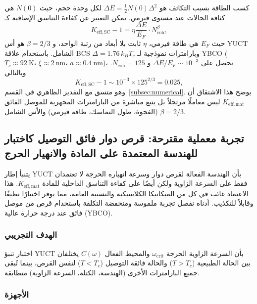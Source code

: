 \documentclass[12pt,a4paper]{article}
\begin{document}
	كسب الطاقة بسبب التكاثف هو \(\Delta E = \frac{1}{2} N(0) \Delta^2\) لكل وحدة حجم، حيث \(N(0)\) هي كثافة الحالات عند مستوى فيرمي. يمكن التعبير عن كفاءة التناسق الإضافية كـ
	\[
	K_{\mathrm{eff,SC}} - 1 = \eta \frac{\Delta E}{E_F} \cdot N_{\text{coh}}^{\beta},
	\]
	حيث \(E_F\) هي طاقة فيرمي، \(\eta\) ثابت بلا أبعاد من رتبة الواحد، و \(\beta = 2/3\) هو أس YUCT الشامل. باستخدام علاقة BCS \(\Delta = 1.76 \, k_B T_c\) وبارامترات نموذجية لـ YBCO (\(T_c \approx 92\ \text{K}\)، \(\xi \approx 2\ \text{nm}\)، \(a \approx 0.4\ \text{nm}\))، نحصل على \(\Delta E/E_F \sim 10^{-3}\) و \(N_{\text{coh}} = 125\). وبالتالي
	\[
	K_{\mathrm{eff,SC}} - 1 \sim 10^{-3} \times 125^{2/3} = 0.025,
	\]
	وهو متسق مع التقدير الظاهري في القسم~\ref{subsec:numerical}. يوضح هذا الاشتقاق أن \(K_{\mathrm{eff,mat}}\) ليس معاملًا مرتجلاً بل يتبع مباشرة من البارامترات المجهرية للموصل الفائق (الفجوة، طول التماسك، طاقة فيرمي) والأس الشامل \(\beta = 2/3\).
	
	\subsection{تجربة معملية مقترحة: قرص دوار فائق التوصيل كاختبار للهندسة المعتمدة على المادة والانهيار الحرج}
	
	يتنبأ إطار YUCT بأن الهندسة الفعالة لقرص دوار وسرعة انهياره الحرجة لا تعتمدان فقط على السرعة الزاوية ولكن أيضًا على كفاءة التناسق الداخلية للمادة \(K_{\mathrm{eff,mat}}\). هذا الاعتماد غائب في كل من الميكانيكا الكلاسيكية والنسبية العامة، مما يوفر اختبارًا نظيفًا وقابلاً للتكذيب. أدناه نفصل تجربة ملموسة ومنخفضة التكلفة باستخدام قرص من موصل فائق عند درجة حرارة عالية (YBCO).
	
	\subsubsection{الهدف التجريبي}
	
	اختبار تنبؤ YUCT بأن السرعة الزاوية الحرجة \(\omega_{\text{crit}}\) والمحيط الفعال \(C(\omega)\) يختلفان بين الحالة الطبيعية (\(T > T_c\)) والحالة فائقة التوصيل (\(T < T_c\)) لنفس القرص، بينما تُبقى جميع البارامترات الأخرى (الهندسة، الكتلة، السرعة الزاوية) متطابقة.
	
	\subsubsection{الأجهزة}
	
\end{document}
